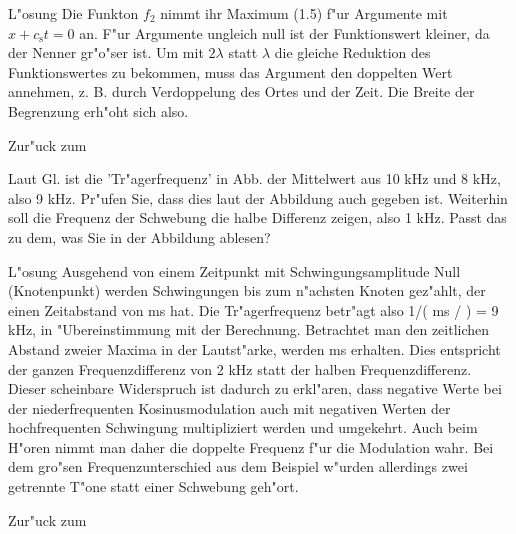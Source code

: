 \begin{MExercises}
\begin{MExercise}
\begin{MHint}{L"osung} 
Die Funkton $f_2$ nimmt ihr Maximum (1.5) f"ur Argumente mit $x+c_\mathrm{s}t=0$ an. F"ur Argumente ungleich null ist der Funktionswert kleiner, da der Nenner gr"o"ser ist. Um mit $2\lambda$ statt $\lambda$ die gleiche Reduktion des Funktionswertes zu bekommen, muss das Argument den doppelten Wert annehmen, z. B. durch Verdoppelung des Ortes und der Zeit. Die Breite der Begrenzung erh"oht sich also. 
\end{MHint}

Zur"uck zum 
\end{MExercise}

\begin{MExercise}
Laut Gl.  ist die 'Tr"agerfrequenz' in Abb.  der Mittelwert aus 10 kHz und 8 kHz, also 9 kHz. Pr"ufen Sie, dass dies laut der Abbildung auch gegeben ist. Weiterhin soll die Frequenz der Schwebung die halbe Differenz zeigen, also 1 kHz. Passt das zu dem, was Sie in der Abbildung ablesen?

\begin{MHint}{L"osung}
Ausgehend von einem Zeitpunkt mit Schwingungsamplitude Null (Knotenpunkt) werden  Schwingungen bis zum n"achsten Knoten gez"ahlt, der einen Zeitabstand von  ms hat. Die Tr"agerfrequenz betr"agt also 1/( ms / ) = 9 kHz, in "Ubereinstimmung mit der Berechnung. Betrachtet man den zeitlichen Abstand zweier Maxima in der Lautst"arke, werden  ms erhalten. Dies entspricht der ganzen Frequenzdifferenz von 2 kHz statt der halben Frequenzdifferenz. Dieser scheinbare Widerspruch ist dadurch zu erkl"aren, dass negative Werte bei der niederfrequenten Kosinusmodulation auch mit negativen Werten der hochfrequenten Schwingung multipliziert werden und umgekehrt. Auch beim H"oren nimmt man daher die doppelte Frequenz f"ur die Modulation wahr. Bei dem gro"sen Frequenzunterschied aus dem Beispiel w"urden allerdings zwei getrennte T"one statt einer Schwebung geh"ort.  
\end{MHint}

Zur"uck zum 
\end{MExercise}
\end{MExercises}


